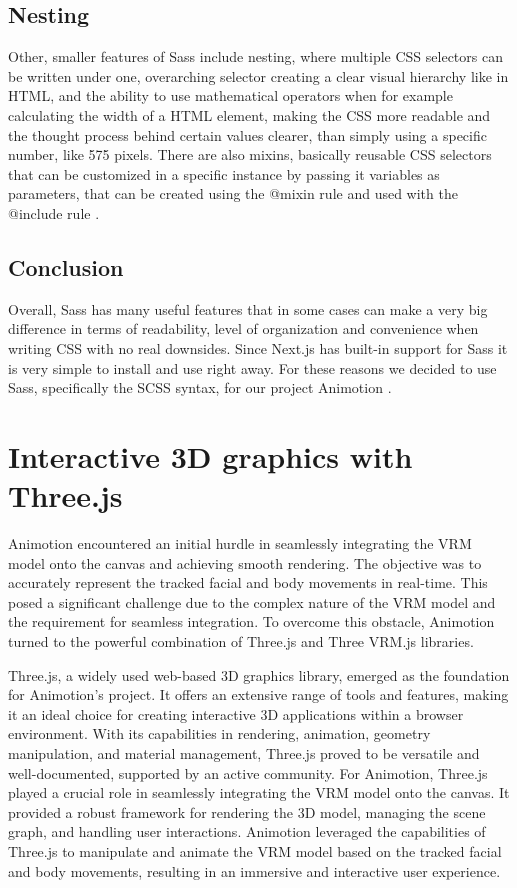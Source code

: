 \subsection{Nesting}
Other, smaller features of Sass include nesting, where multiple CSS selectors can be written under one, overarching selector creating a
clear visual hierarchy like in HTML, and the ability to use mathematical operators when for example calculating the width of a HTML
element, making the CSS more readable and the thought process behind certain values clearer, than simply using a specific number, like
575 pixels. There are also mixins, basically reusable CSS selectors that can be customized in a specific instance by passing it
variables as parameters, that can be created using the @mixin rule and used with the @include rule \cite{SassFeatures}.

\subsection{Conclusion}
Overall, Sass has many useful features that in some cases can make a very big difference in terms of readability, level of organization and
convenience when writing CSS with no real downsides. Since Next.js has built-in support for Sass it is very simple to install and use right
away. For these reasons we decided to use Sass, specifically the SCSS syntax, for our project Animotion \cite{NextjsCSSSupport}.

\section{Interactive 3D graphics with Three.js}
Animotion encountered an initial hurdle in seamlessly integrating the VRM model onto the canvas 
and achieving smooth rendering. The objective was to accurately represent the tracked facial and 
body movements in real-time. This posed a significant challenge due to the complex nature of the VRM 
model and the requirement for seamless integration. To overcome this obstacle, Animotion turned to the 
powerful combination of Three.js and Three VRM.js libraries.

Three.js, a widely used web-based 3D graphics library, emerged as the foundation for 
Animotion's project. It offers an extensive range of tools and features, making it an ideal 
choice for creating interactive 3D applications within a browser environment. With its capabilities 
in rendering, animation, geometry manipulation, and material management, Three.js proved to be 
versatile and well-documented, supported by an active community.
For Animotion, Three.js played a crucial role in seamlessly integrating the VRM model onto 
the canvas. It provided a robust framework for rendering the 3D model, managing the scene graph, 
and handling user interactions. Animotion leveraged the capabilities of Three.js to manipulate and 
animate the VRM model based on the tracked facial and body movements, resulting in an immersive and interactive user experience. \cite{threejs}

